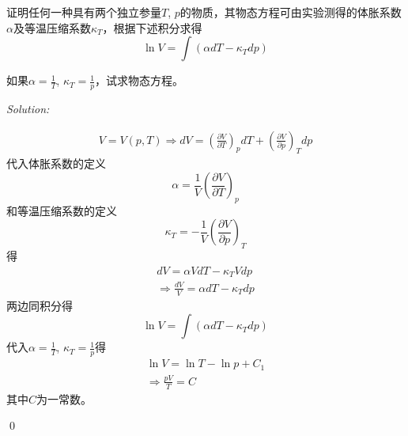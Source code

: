 \documentclass[12pt,a4paper]{article}
\newenvironment{problem}[2][Problem]{\begin{trivlist}
\item[\hskip \labelsep {\bfseries #1}\hskip \labelsep {\bfseries #2.}]}{\end{trivlist}}
\newenvironment{sol}
    {\emph{Solution:}
    }
    {
    \qed
    }
\begin{document}
\begin{problem}{1-2}
证明任何一种具有两个独立参量$T$, $p$的物质，其物态方程可由实验测得的体胀系数$\alpha$及等温压缩系数$\kappa_T$，根据下述积分求得
\[
\ln V=\int(\alpha dT-\kappa_Tdp)
\]

如果$\alpha=\frac{1}{T}$, $\kappa_T=\frac{1}{p}$，试求物态方程。
\end{problem}
\begin{sol}
\begin{gather}
V=V(p,T)
\Longrightarrow dV=\left(\frac{\partial V}{\partial T}\right)_pdT+\left(\frac{\partial V}{\partial p}\right)_Tdp
\end{gather}
代入体胀系数的定义
\begin{equation}
\alpha=\frac{1}{V}\left(\frac{\partial V}{\partial T}\right)_p
\end{equation}
和等温压缩系数的定义
\begin{equation}
\kappa_T=-\frac{1}{V}\left(\frac{\partial V}{\partial p}\right)_T
\end{equation}
得
\begin{gather}
dV=\alpha VdT-\kappa_TVdp\\
\Longrightarrow\frac{dV}{V}=\alpha dT-\kappa_Tdp
\end{gather}
两边同积分得
\begin{equation}
\ln V=\int(\alpha dT-\kappa_Tdp)
\end{equation}
代入$\alpha=\frac{1}{T}$, $\kappa_T=\frac{1}{p}$得
\begin{gather}
\ln V=\ln T-\ln p+C_1\\
\Longrightarrow\frac{pV}{T}=C
\end{gather}
其中$C$为一常数。
\end{sol}
\end{document}
